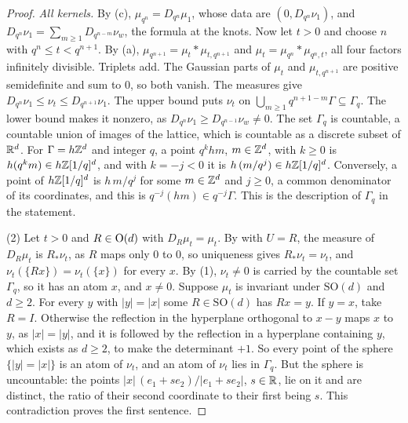\begin{proof}
\emph{All kernels.} By (c), $\mu_{q^n} = D_{q^n}\mu_1$, whose data are $(0, D_{q^n}\nu_1)$, and
$D_{q^n}\nu_1 = \sum_{m \ge 1}D_{q^{n-m}}\nu_w$, the formula at the knots. Now let $t > 0$ and
choose $n$ with $q^n \le t < q^{n+1}$. By (a), $\mu_{q^{n+1}} = \mu_t * \mu_{t,q^{n+1}}$ and
$\mu_t = \mu_{q^n} * \mu_{q^n,t}$, all four factors infinitely divisible. Triplets add. The Gaussian
parts of $\mu_t$ and $\mu_{t,q^{n+1}}$ are positive semidefinite and sum to $0$, so both vanish.
The \Levy{} measures give $D_{q^n}\nu_1 \le \nu_t \le D_{q^{n+1}}\nu_1$. The upper bound puts
$\nu_t$ on $\bigcup_{m \ge 1}q^{n+1-m}\Gamma \subseteq \Gamma_q$. The lower bound makes it nonzero,
as $D_{q^n}\nu_1 \ge D_{q^{n-1}}\nu_w \ne 0$. The set $\Gamma_q$ is countable, a countable union of
images of the lattice, which is countable as a discrete subset of $\mathbb{R}^d$. For $\Gamma = h\mathbb{Z}^d$ and
integer $q$, a point $q^khm$, $m \in \mathbb{Z}^d$, with $k \ge 0$ is $h(q^km) \in h\mathbb{Z}[1/q]^d$, and with
$k = -j < 0$ it is $h\,(m/q^j) \in h\mathbb{Z}[1/q]^d$. Conversely, a point of $h\mathbb{Z}[1/q]^d$ is $h\,m/q^j$
for some $m \in \mathbb{Z}^d$ and $j \ge 0$, a common denominator of its coordinates, and this is
$q^{-j}(hm) \in q^{-j}\Gamma$. This is the description of $\Gamma_q$ in the statement.

(2) Let $t > 0$ and $R \in \mathrm{O}(d)$ with $D_R\mu_t = \mu_t$. By  with $U = R$,
the \Levy{} measure of $D_R\mu_t$ is $R_*\nu_t$, as $R$ maps only $0$ to $0$, so uniqueness gives
$R_*\nu_t = \nu_t$, and $\nu_t(\{Rx\}) = \nu_t(\{x\})$ for every $x$. By (1), $\nu_t \ne 0$ is
carried by the countable set $\Gamma_q$, so it has an atom $x$, and $x \ne 0$. Suppose $\mu_t$ is
invariant under $\mathrm{SO}(d)$ and $d \ge 2$. For every $y$ with $|y| = |x|$ some
$R \in \mathrm{SO}(d)$ has $Rx = y$. If $y = x$, take $R = I$. Otherwise the reflection in the
hyperplane orthogonal to $x - y$ maps $x$ to $y$, as $|x| = |y|$, and it is followed by the
reflection in a hyperplane containing $y$, which exists as $d \ge 2$, to make the determinant $+1$. So every point of the sphere $\{|y| = |x|\}$ is an atom
of $\nu_t$, and an atom of $\nu_t$ lies in $\Gamma_q$. But the sphere is uncountable: the points
$|x|\,(e_1 + se_2)/|e_1 + se_2|$, $s \in \mathbb{R}$, lie on it and are distinct, the ratio of their second
coordinate to their first being $s$. This contradiction proves the first sentence.


\end{proof}

